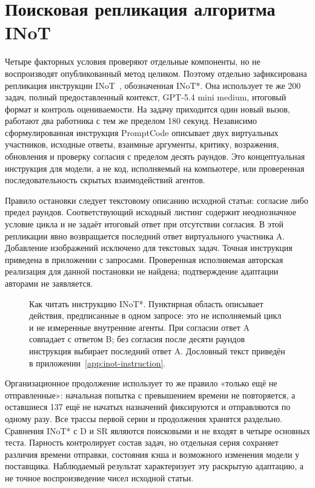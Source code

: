 \section{Поисковая репликация алгоритма INoT}
\label{sec:inot-replication}
Четыре факторных условия проверяют отдельные компоненты, но не воспроизводят опубликованный метод целиком. Поэтому отдельно зафиксирована репликация инструкции INoT~\cite{sun2025inot}, обозначенная INoT*. Она использует те же 200 задач, полный предоставленный контекст, GPT-5.4 mini medium, итоговый формат и контроль оцениваемости. На задачу приходится один новый вызов, работают два работника с тем же пределом 180 секунд. Независимо сформулированная инструкция PromptCode описывает двух виртуальных участников, исходные ответы, взаимные аргументы, критику, возражения, обновления и проверку согласия с пределом десять раундов. Это концептуальная инструкция для модели, а не код, исполняемый на компьютере, или проверенная последовательность скрытых взаимодействий агентов.

Правило остановки следует текстовому описанию исходной статьи: согласие либо предел раундов. Соответствующий исходный листинг содержит неоднозначное условие цикла и не задаёт итоговый ответ при отсутствии согласия. В этой репликации явно возвращается последний ответ виртуального участника A. Добавление изображений исключено для текстовых задач. Точная инструкция приведена в приложении с запросами. Проверенная исполняемая авторская реализация для данной постановки не найдена; подтверждение адаптации авторами не заявляется.

\begin{figure}[htbp]\centering

\caption{Как читать инструкцию INoT*. Пунктирная область описывает действия, предписанные в одном запросе: это не исполняемый цикл и не измеренные внутренние агенты. При согласии ответ A совпадает с ответом B; без согласия после десяти раундов инструкция выбирает последний ответ A. Дословный текст приведён в приложении~\ref{app:inot-instruction}.}
\label{fig:inot-instruction}
\end{figure}
\FloatBarrier

Организационное продолжение использует то же правило «только ещё не отправленные»: начальная попытка с превышением времени не повторяется, а оставшиеся 137 ещё не начатых назначений фиксируются и отправляются по одному разу. Все трассы первой серии и продолжения хранятся раздельно. Сравнения INoT* с D и SR являются поисковыми и не входят в четыре основных теста. Парность контролирует состав задач, но отдельная серия сохраняет различия времени отправки, состояния кэша и возможного изменения модели у поставщика. Наблюдаемый результат характеризует эту раскрытую адаптацию, а не точное воспроизведение чисел исходной статьи.

